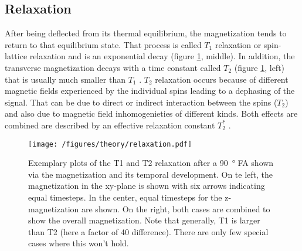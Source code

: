         \subsection{Relaxation}
        \label{chapter:theory:relaxation}
        After being deflected from its thermal equilibrium, the magnetization tends to return to that equilibrium state. That process is called $T_1$ relaxation or spin-lattice relaxation and is an exponential decay (figure \ref{theory:figure:relaxation}, middle). In addition, the transverse magnetization decays with a time constant called $T_2$ (figure \ref{theory:figure:relaxation}, left) that is usually much smaller than $T_1$ \cite{levitt_spin_nodate}. $T_2$ relaxation occurs because of different magnetic fields experienced by the individual spins leading to a dephasing of the signal. That can be due to direct or indirect interaction between the spins ($T_2$) and also due to magnetic field inhomogenieties of different kinds. Both effects are combined are described by an effective relaxation constant $T_2^*$ \cite{chavhan_principles_2009}.
            \begin{figure}
                \centering
                \texttt{[image: /figures/theory/relaxation.pdf]}
                \caption[Relaxation in NMR]{Exemplary plots of the T1 and T2 relaxation after a \SI{90}{\degree} FA shown via the magnetization and its temporal development. On te left, the magnetization in the xy-plane is shown with six arrows indicating equal timesteps. In the center, equal timesteps for the z-magnetization are shown. On the right, both cases are combined to show the overall magnetization. Note that generally, T1 is larger than T2 (here a factor of 40 difference). There are only few special cases where this won't hold.}
                \label{theory:figure:relaxation}
            \end{figure}
